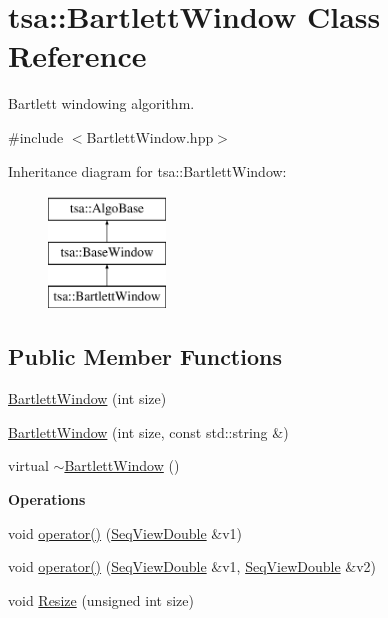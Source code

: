 \hypertarget{classtsa_1_1_bartlett_window}{}\section{tsa\+:\+:Bartlett\+Window Class Reference}
\label{classtsa_1_1_bartlett_window}


Bartlett windowing algorithm.  




{\ttfamily \#include $<$Bartlett\+Window.\+hpp$>$}

Inheritance diagram for tsa\+:\+:Bartlett\+Window\+:\begin{figure}[H]
\begin{center}
\leavevmode
\includegraphics[height=3.000000cm]{classtsa_1_1_bartlett_window}
\end{center}
\end{figure}
\subsection*{Public Member Functions}
\begin{DoxyCompactItemize}
\item 
\hyperlink{classtsa_1_1_bartlett_window_a9177fa400660b6bdecfcecbfbffeedbe}{Bartlett\+Window} (int size)
\item 
\hyperlink{classtsa_1_1_bartlett_window_a9da0612e0081996ef30439403a8a9c87}{Bartlett\+Window} (int size, const std\+::string \&)
\item 
virtual \hyperlink{classtsa_1_1_bartlett_window_a45ce87f449514520865841aa3ac0abac}{$\sim$\+Bartlett\+Window} ()
\end{DoxyCompactItemize}
\begin{Indent}\textbf{ Operations}\par
\begin{DoxyCompactItemize}
\item 
void \hyperlink{classtsa_1_1_bartlett_window_a9bad239fb8fbaa295713c904e3d9d92e}{operator()} (\hyperlink{namespacetsa_ac599574bcc094eda25613724b8f3ca9e}{Seq\+View\+Double} \&v1)
\item 
void \hyperlink{classtsa_1_1_bartlett_window_a44d722552ca5281e28a28eadbed2099e}{operator()} (\hyperlink{namespacetsa_ac599574bcc094eda25613724b8f3ca9e}{Seq\+View\+Double} \&v1, \hyperlink{namespacetsa_ac599574bcc094eda25613724b8f3ca9e}{Seq\+View\+Double} \&v2)
\item 
void \hyperlink{classtsa_1_1_bartlett_window_af63f6fdd7e2a10d77db1c7363e9963f5}{Resize} (unsigned int size)
\end{DoxyCompactItemize}
\end{Indent}
